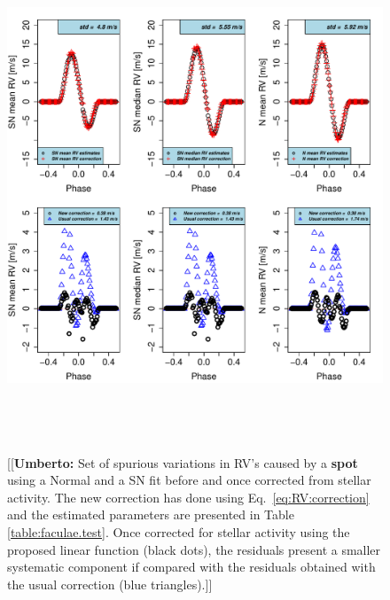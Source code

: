 \documentclass{aa}
\newcommand{\umberto}[1]{{\color{green}[[\textbf{Umberto: }#1]]}}
\begin{document}
\begin{figure}[htbp]
   \centering
\includegraphics[height = 6in]{Spot_NEW_CORRECTION_[3]CorrectionActivity_RadialVelocity_vs_time.pdf} 
   \caption{\umberto{Set of  spurious variations in RV's caused by a \textbf{spot} using a Normal and a SN fit before and once corrected from stellar activity. The new correction has done using Eq.~\ref{eq:RV:correction} and the estimated parameters are presented in Table \ref{table:faculae.test}. Once corrected for stellar activity using the proposed linear function (black dots), the residuals present a smaller systematic component if compared with the residuals obtained with the usual correction (blue triangles).}}
    \label{fig:spot.correction}
\end{figure}
\end{document}
